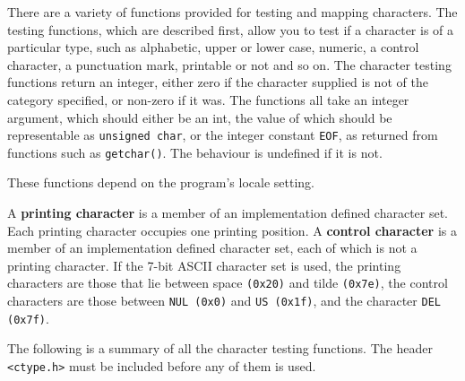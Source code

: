   

  There are a variety of functions provided for testing and
   mapping characters.  The testing functions, which are
   described first, allow you to test if a character is of a
   particular type, such as alphabetic, upper or lower case,
   numeric, a control character, a punctuation mark, printable
   or not and so on.  The character testing functions return an
   integer, either zero if the character supplied is not of the
   category specified, or non-zero if it was.  The functions
   all take an integer argument, which should either be an int,
   the value of which should be representable as \texttt{unsigned char},
   or the integer constant \texttt{EOF}, as returned from functions such
   as \texttt{getchar()}.  The behaviour is undefined if it is not.


  These functions depend on the program's locale setting.


  A \textbf{printing character} is a member of an implementation
   defined character set.  Each printing character occupies one
   printing position.  A \textbf{control character} is a member of an
   implementation defined character set, each of which is not a
   printing character.  If the 7-bit ASCII character set is used, the printing
   characters are those that lie between space \texttt{(0x20)} and tilde
   \texttt{(0x7e)}, the control characters are
   those between \texttt{NUL (0x0)} and \texttt{US (0x1f)},
   and the character \texttt{DEL (0x7f)}.


  The following is a summary of all the character testing
   functions.  The header \texttt{<ctype.h>} must be included before
   any of them is used.


